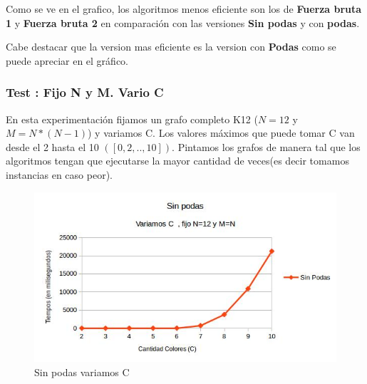 Como se ve en el grafico, los algoritmos menos eficiente son los de  \textbf{Fuerza bruta 1} y \textbf{Fuerza bruta 2} en comparación con las  versiones \textbf{Sin podas} y con \textbf{podas}. \newline
 
Cabe destacar que la version mas eficiente es la version con \textbf{Podas} como se puede apreciar en el gráfico. 


\vspace*{0.3cm}


\newpage
\subsubsection{Test : Fijo N y M. Vario C}

En esta experimentación fijamos un grafo completo K12 ($N = 12$ y $M=N*(N-1)$) y variamos C. Los valores máximos que puede tomar C van desde el 2 hasta  el 10 $([0,2,..,10])$. Pintamos los grafos de manera tal que los algoritmos tengan que ejecutarse la mayor cantidad de veces(es decir tomamos instancias en caso peor). \newline

\begin{figure}[h]
  \begin{center}
      \includegraphics[scale=0.60]{imagenes/imgEjercicio2/SinPodasVariaC.jpg}
  \end{center}
  \caption{Sin podas variamos C}
\end{figure}

